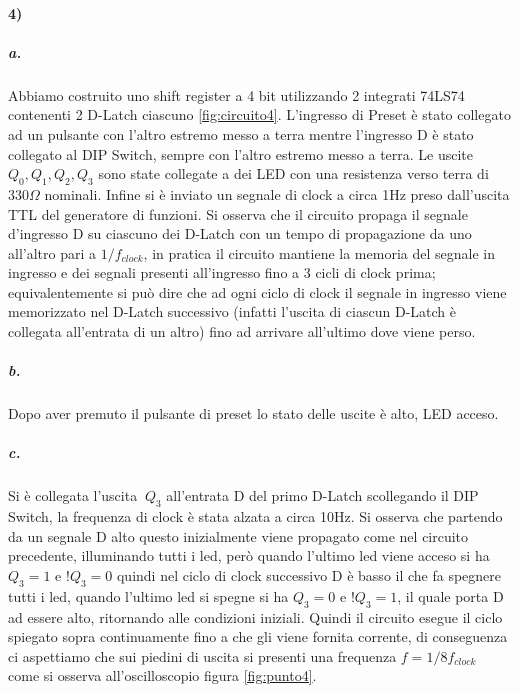 \documentclass{article}
\begin{document}
	\paragraph{4)}
	\subparagraph{a.} Abbiamo costruito uno shift register a 4 bit utilizzando 2 integrati 74LS74 contenenti 2 D-Latch ciascuno \ref{fig:circuito4}. L'ingresso di Preset è stato collegato ad un pulsante con l'altro estremo messo a terra mentre l'ingresso D è stato collegato al DIP Switch, sempre con l'altro estremo messo a terra. Le uscite $Q_0,Q_1,Q_2,Q_3$ sono state collegate a dei LED con una resistenza verso terra di $330\Omega$ nominali. Infine si è inviato un segnale di clock a circa 1Hz preso dall'uscita TTL del generatore di funzioni. Si osserva che il circuito propaga il segnale d'ingresso D su ciascuno dei D-Latch con un tempo di propagazione da uno all'altro pari a $1/f_{clock}$, in pratica il circuito mantiene la memoria del segnale in ingresso e dei segnali presenti all'ingresso fino a 3 cicli di clock prima; equivalentemente si può dire che ad ogni ciclo di clock il segnale in ingresso viene memorizzato nel D-Latch successivo (infatti l'uscita di ciascun D-Latch è collegata all'entrata di un altro) fino ad arrivare all'ultimo dove viene perso.
	\subparagraph{b.} Dopo aver premuto il pulsante di preset lo stato delle uscite è alto, LED acceso.
	\subparagraph{c.} Si è collegata l'uscita $\ Q_{3}$ all'entrata D del primo D-Latch scollegando il DIP Switch, la frequenza di clock è stata alzata a circa 10Hz. Si osserva che partendo da un segnale D alto questo inizialmente viene propagato come nel circuito precedente, illuminando tutti i led, però quando l'ultimo led viene acceso si ha $Q_{3}=1$ e $!Q_{3}=0$ quindi nel ciclo di clock successivo D è basso il che fa spegnere tutti i led, quando l'ultimo led si spegne si ha $Q_{3}=0$ e $!Q_{3}=1$, il quale porta D ad essere alto, ritornando alle condizioni iniziali. Quindi il circuito esegue il ciclo spiegato sopra continuamente fino a che gli viene fornita corrente, di conseguenza ci aspettiamo che sui piedini di uscita si presenti una frequenza $f=1/8f_{clock}$ come si osserva all'oscilloscopio figura \ref{fig:punto4}.
	
\end{document}
